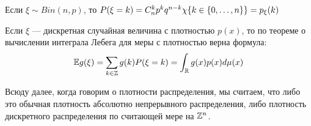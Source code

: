 \begin{example}
	Если $\xi \sim Bin(n, p)$, то $P(\xi = k) = C_n^kp^kq^{n - k}\chi\{k \in \{0, \ldots, n\}\} = p_\xi(k)$
\end{example}

\begin{reminder}
	Если $\xi$ --- дискретная случайная величина с плотностью $p(x)$, то по теореме о вычислении интеграла Лебега для меры с плотностью верна формула:
	\[
		\mathbb{E} g(\xi) = \sum_{k \in \mathbb{Z}} g(k)P(\xi = k) = \int_{\mathbb{R}} g(x)p(x)d\mu(x)
	\]
\end{reminder}

\begin{note}
	Всюду далее, когда говорим о плотности распределения, мы считаем, что либо это обычная плотность абсолютно непрерывного распределения, либо плотность дискретного распределения по считающей мере на $\mathbb{Z}^n$.
\end{note}